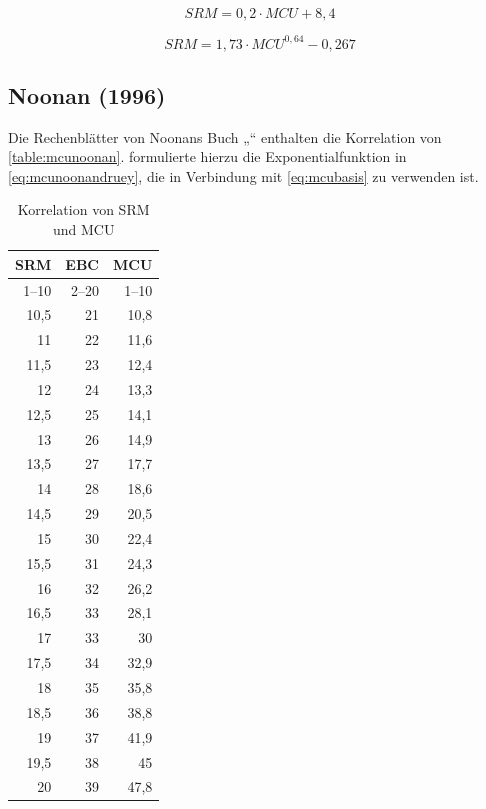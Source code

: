 \documentclass[a4paper,parskip=half]{scrartcl}
\newcommand{\MCUL}{\mathit{MCU}}
\newcommand{\SRM}{\mathit{SRM}}
\begin{document}
\begin{equation}
\SRM = 0,2 \cdot \MCUL + 8,4
\label{eq:mcudaniels}
\end{equation}

\begin{equation}
\SRM = 1,73 \cdot \MCUL^{0,64} - 0,267
\label{eq:mcudanielsdruey}
\end{equation}

\subsection*{Noonan (1996)}

Die Rechenblätter von Noonans Buch „“ enthalten die Korrelation von \autoref{table:mcunoonan}. \textcite{Druey1998} formulierte hierzu die Exponentialfunktion in \autoref{eq:mcunoonandruey}, die in Verbindung mit \autoref{eq:mcubasis} zu verwenden ist.

\begin{table}[H]
\centering
\begin{tabular}{rrr}
\toprule
\multicolumn{1}{c}{\textbf{SRM}} & \multicolumn{1}{c}{\textbf{EBC}} & \multicolumn{1}{c}{\textbf{MCU}} \\
\midrule
1–10 & 2–20 & 1–10 \\
10,5 & 21 & 10,8 \\
11   & 22 & 11,6 \\
11,5 & 23 & 12,4 \\
12   & 24 & 13,3 \\
12,5 & 25 & 14,1 \\
13   & 26 & 14,9 \\
13,5 & 27 & 17,7 \\
14   & 28 & 18,6 \\
14,5 & 29 & 20,5 \\
15   & 30 & 22,4 \\
15,5 & 31 & 24,3 \\
16   & 32 & 26,2 \\
16,5 & 33 & 28,1 \\
17   & 33 & 30 \\
17,5 & 34 & 32,9 \\
18   & 35 & 35,8 \\
18,5 & 36 & 38,8 \\
19   & 37 & 41,9 \\
19,5 & 38 & 45 \\
20   & 39 & 47,8 \\
\bottomrule
\end{tabular}
\caption{Korrelation von SRM und MCU \parencite[206]{Noonan1996}}
\label{table:mcunoonan}
\end{table}
\end{document}
